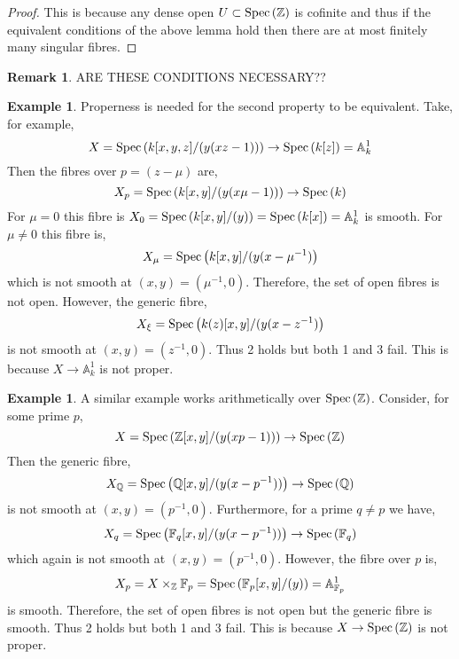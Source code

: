 \documentclass[12pt]{extarticle}
\newcommand{\Z}{\mathbb{Z}}
\theoremstyle{definition}
\newtheorem{example}[theorem]{Example}
\newtheorem{remark}{Remark}
\newcommand{\A}{\mathbb{A}}
\begin{document}
\begin{proof}
This is because any dense open $U \subset \Spec{\Z}$ is cofinite and thus if the equivalent conditions of the above lemma hold then there are at most finitely many singular fibres. 
\end{proof}

\begin{remark}
ARE THESE CONDITIONS NECESSARY?? 
\end{remark}

\begin{example}
Properness is needed for the second property to be equivalent. Take, for example,
\[ X = \Spec{k[x, y, z]/(y(xz - 1))} \to \Spec{k[z]} = \A^1_k \]
Then the fibres over $p = (z - \mu)$ are,
\[ X_p = \mathrm{Spec}\left(k[x,y]/(y(x\mu - 1))\right) \to \mathrm{Spec}\left(k\right) \]
For $\mu = 0$ this fibre is $X_{0} = \Spec{k[x,y]/(y)} = \Spec{k[x]} = \A^1_k$ is smooth. For $\mu \neq 0$ this fibre is,
\[ X_\mu = \mathrm{Spec}\left(k[x,y]/(y(x - \mu^{-1})\right) \]
which is not smooth at $(x,y) = (\mu^{-1},0)$. Therefore, the set of open fibres is not open. However, the generic fibre,
\[ X_\xi = \mathrm{Spec}\left(k(z)[x,y]/(y(x - z^{-1})\right) \]
is not smooth at $(x,y) = (z^{-1}, 0)$. Thus 2 holds but both 1 and 3 fail. This is because $X \to \A^1_k$ is not proper. 
\end{example}

\begin{example}
A similar example works arithmetically over $\Spec{\Z}$. Consider, for some prime $p$,
\[ X = \Spec{\Z[x,y]/(y(xp - 1))} \to \Spec{\Z} \]
Then the generic fibre,
\[ X_{\mathbb{Q}} = \mathrm{Spec}\left(\mathbb{Q}[x,y]/(y(x - p^{-1}))\right) \to \mathrm{Spec}\left(\mathbb{Q}\right) \]
is not smooth at $(x,y) = (p^{-1}, 0)$. Furthermore, for a prime $q \neq p$ we have,
\[ X_q = \mathrm{Spec}\left(\mathbb{F}_q[x,y]/(y(x - p^{-1}))\right) \to \mathrm{Spec}\left(\mathbb{F}_q\right) \]
which again is not smooth at $(x, y) = (p^{-1}, 0)$. However, the fibre over $p$ is,
\[ X_p = X \times_\Z \mathbb{F}_p = \Spec{\mathbb{F}_p[x,y]/(y)} = \A^1_{\mathbb{F}_p} \]
is smooth. Therefore, the set of open fibres is not open but the generic fibre is smooth. Thus 2 holds but both 1 and 3 fail. This is because $X \to \Spec{\Z}$ is not proper. 
\end{example}
\end{document}
